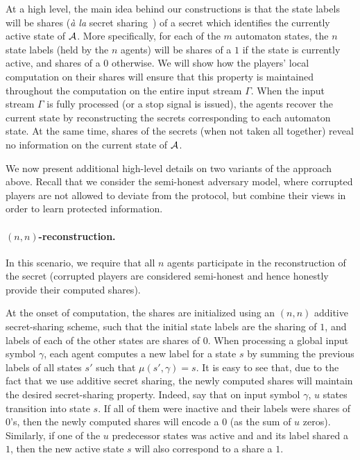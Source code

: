\documentclass[letterpaper,11pt]{article}
\begin{document}
At a high level, the main idea behind our constructions is that the
state labels will be shares ({\em \`{a} la} secret
sharing~\cite{Sha79}) of a secret which identifies the currently
active state of $\cal A$.  More specifically, for each of the $m$
automaton states, the $n$ state labels (held by the $n$ agents) will
be shares of a $1$ if the state is currently active, and shares of a
$0$ otherwise.  We will show how the players' local computation on
their shares will ensure that this property is maintained throughout
the computation on the entire input stream $\Gamma$.  When the input
stream $\Gamma$ is fully processed (or a stop signal is issued), the
agents recover the current state by reconstructing the secrets
corresponding to each automaton state.  At the same time, shares of
the secrets (when not taken all together) reveal no information on the
current state of $\cal A$.


We now present additional high-level details on two variants of
the approach above. Recall that we consider the semi-honest adversary model, 
where corrupted players are not allowed to deviate from the protocol, but 
combine their views in order to learn protected information.

\vspace{-.1in}
\paragraph{$(n,n)$-reconstruction.}  In this scenario, we require that all 
$n$ agents participate in the reconstruction of the secret (corrupted
players are considered semi-honest and hence honestly provide their computed
shares).

At the onset of computation, the shares are initialized using an $(n,n)$
additive secret-sharing scheme, such that the initial state labels are the
sharing of $1$, and labels of each of the other states are shares of $0$.
When processing a global input symbol $\gamma$, each agent computes a
new label for a state $s$ by summing the previous labels of all states
$s'$ such that $\mu(s',\gamma)=s$.  It is easy to see that, due to the
fact that we use additive secret sharing, the newly computed shares
will maintain the desired
secret-sharing property.  Indeed, say that on input symbol
$\gamma$, $u$ states transition into state $s$.  If all of them
were inactive and their labels were shares of $0$'s, then the newly computed 
shares 
will encode a $0$ (as the sum of $u$ zeros).  Similarly, if one of the $u$
predecessor states was active and and its label shared a $1$, then  
the new active state $s$ will also correspond to a share a $1$.
\end{document}
